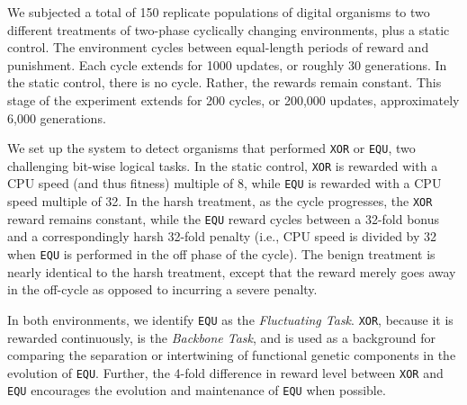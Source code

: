 \documentclass[10pt,letterpaper,final]{article}
\begin{document}
We subjected a total of 150 replicate populations of digital organisms to two different treatments of two-phase cyclically changing environments, plus a static control. The environment cycles between equal-length periods of reward and punishment. Each cycle extends for 1000 updates, or roughly 30 generations. In the static control, there is no cycle. Rather, the rewards remain constant. This stage of the experiment extends for 200 cycles, or 200,000 updates, approximately 6,000 generations.



We set up the system to detect organisms that performed \texttt{XOR} or \texttt{EQU}, two challenging bit-wise logical tasks. In the static control, \texttt{XOR} is rewarded with a CPU speed (and thus fitness) multiple of 8, while \texttt{EQU} is rewarded with a CPU speed multiple of 32. In the harsh treatment, as the cycle progresses, the \texttt{XOR} reward remains constant, while the \texttt{EQU} reward cycles between a 32-fold bonus and a correspondingly harsh 32-fold penalty (i.e., CPU speed is divided by 32 when \texttt{EQU} is performed in the off phase of the cycle). The benign treatment is nearly identical to the harsh treatment, except that the reward merely goes away in the off-cycle as opposed to incurring a severe penalty.

In both environments, we identify \texttt{EQU} as the \textit{Fluctuating Task}. \texttt{XOR}, because it is rewarded continuously, is the \textit{Backbone Task}, and is used as a background for comparing the separation or intertwining of functional genetic components in the evolution of \texttt{EQU}. Further, the 4-fold difference in reward level between \texttt{XOR} and \texttt{EQU} encourages the evolution and maintenance of \texttt{EQU} when possible.
\end{document}
